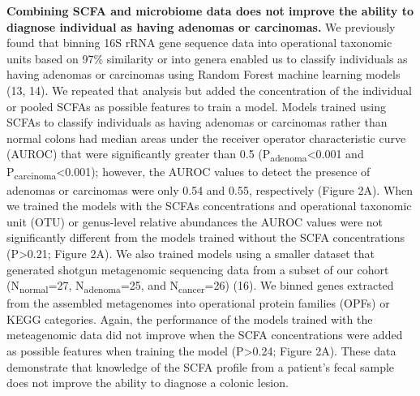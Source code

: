 \documentclass[11pt,]{article}
\begin{document}
\textbf{Combining SCFA and microbiome data does not improve the ability
to diagnose individual as having adenomas or carcinomas.} We previously
found that binning 16S rRNA gene sequence data into operational
taxonomic units based on 97\% similarity or into genera enabled us to
classify individuals as having adenomas or carcinomas using Random
Forest machine learning models (13, 14). We repeated that analysis but
added the concentration of the individual or pooled SCFAs as possible
features to train a model. Models trained using SCFAs to classify
individuals as having adenomas or carcinomas rather than normal colons
had median areas under the receiver operator characteristic curve
(AUROC) that were significantly greater than 0.5
(P\textsubscript{adenoma}\textless{}0.001 and
P\textsubscript{carcinoma}\textless{}0.001); however, the AUROC values
to detect the presence of adenomas or carcinomas were only 0.54 and
0.55, respectively (Figure 2A). When we trained the models with the
SCFAs concentrations and operational taxonomic unit (OTU) or genus-level
relative abundances the AUROC values were not significantly different
from the models trained without the SCFA concentrations
(P\textgreater{}0.21; Figure 2A). We also trained models using a smaller
dataset that generated shotgun metagenomic sequencing data from a subset
of our cohort (N\textsubscript{normal}=27, N\textsubscript{adenoma}=25,
and N\textsubscript{cancer}=26) (16). We binned genes extracted from the
assembled metagenomes into operational protein families (OPFs) or KEGG
categories. Again, the performance of the models trained with the
meteagenomic data did not improve when the SCFA concentrations were
added as possible features when training the model (P\textgreater{}0.24;
Figure 2A). These data demonstrate that knowledge of the SCFA profile
from a patient's fecal sample does not improve the ability to diagnose a
colonic lesion.
\end{document}
